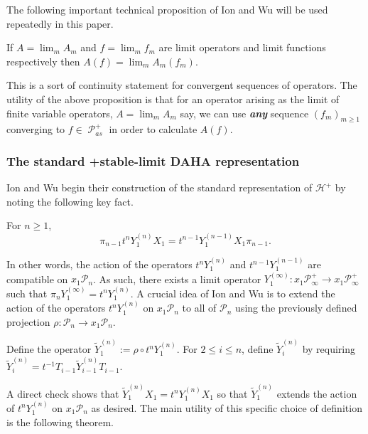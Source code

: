 \documentclass[ALCO,Unicode]{cedram}
\DeclareMathOperator{\sP}{\mathscr{P} }
\begin{document}
The following important technical proposition of Ion and Wu will be used repeatedly in this paper. 

\begin{prop}
    If $A = \lim_{m} A_m$ and $f = \lim_{m} f_m$ are limit operators and limit functions respectively then $A(f) = \lim_{m} A_m(f_m).$
\end{prop}

This is a sort of continuity statement for convergent sequences of operators. The utility of the above proposition is that for an operator arising as the limit of finite variable operators, $A = \lim_{m} A_m$ say, we can use \textbf{\textit{any}} sequence $(f_m)_{m \geq 1}$ converging to $f \in \sP_{as}^{+}$ in order to calculate $A(f)$. 

\subsubsection{The standard +stable-limit DAHA representation}

Ion and Wu begin their construction of the standard representation of $\mathscr{H}^{+}$ by noting the following key fact. 

\begin{prop}
    For $n \geq 1$,  
    $$\pi_{n-1} t^n Y_1^{(n)}X_1 = t^{n-1} Y_1^{(n-1)}X_1\pi_{n-1}.$$
\end{prop}

In other words, the action of the operators $t^nY_1^{(n)}$ and $t^{n-1}Y_1^{(n-1)}$ are compatible on $x_1\mathscr{P}_{n}$. As such, there exists a limit operator $Y_1^{(\infty)}: x_1\mathscr{P}^{+}_{\infty} \rightarrow x_1\mathscr{P}^{+}_{\infty}$ such that $\pi_nY_1^{(\infty)} = t^nY_1^{(n)}$. A crucial idea of Ion and Wu is to extend the action of the operators $t^n Y_1^{(n)}$ on $x_1\mathscr{P}_{n}$ to all of $\mathscr{P}_{n}$ using the previously defined projection $\rho:\mathscr{P}_{n} \rightarrow x_1\mathscr{P}_{n}$.

\begin{defi} \label{defn of deformed y's}
    Define the operator $\widetilde{Y}_1^{(n)} :=  \rho \circ t^n Y_1^{(n)}$. For $2 \leq i \leq n$, define $\widetilde{Y}_i^{(n)}$ by requiring $\widetilde{Y}_i^{(n)} = t^{-1}T_{i-1}\widetilde{Y}_{i-1}^{(n)}T_{i-1}.$
\end{defi}

A direct check shows that $\widetilde{Y}_1^{(n)}X_1 = t^n Y_1^{(n)}X_1$ so that $\widetilde{Y}_1^{(n)}$ extends the action of $t^n Y_1^{(n)}$ on $x_1\mathscr{P}_{n}$ as desired. The main utility of this specific choice of definition is the following theorem.
\end{document}
